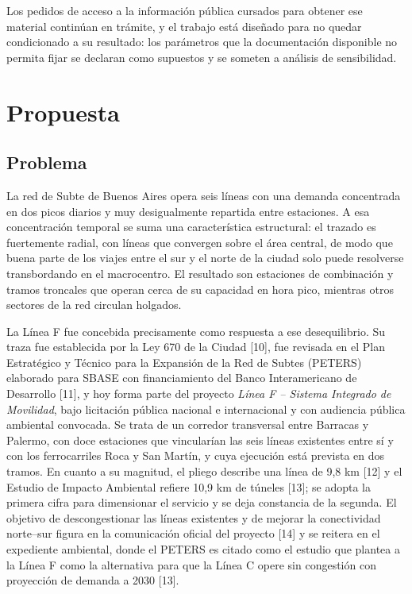\documentclass{article}
\begin{document}
Los pedidos de acceso a la información pública cursados para obtener ese material continúan en trámite, y el
trabajo está diseñado para no quedar condicionado a su resultado: los parámetros que la documentación
disponible no permita fijar se declaran como supuestos y se someten a análisis de sensibilidad.

\section{Propuesta}

\subsection{Problema}

La red de Subte de Buenos Aires opera seis líneas con una demanda concentrada en dos picos diarios y muy
desigualmente repartida entre estaciones. A esa concentración temporal se suma una característica
estructural: el trazado es fuertemente radial, con líneas que convergen sobre el área central, de modo que
buena parte de los viajes entre el sur y el norte de la ciudad solo puede resolverse transbordando en el
macrocentro. El resultado son estaciones de combinación y tramos troncales que operan cerca de su
capacidad en hora pico, mientras otros sectores de la red circulan holgados.

La Línea F fue concebida precisamente como respuesta a ese desequilibrio. Su traza fue establecida por la
Ley 670 de la Ciudad [10], fue revisada en el Plan Estratégico y Técnico para la Expansión de la Red de
Subtes (PETERS) elaborado para SBASE con financiamiento del Banco Interamericano de Desarrollo [11], y hoy
forma parte
del proyecto \textit{Línea F -- Sistema Integrado de Movilidad}, bajo licitación pública nacional
e internacional y con audiencia pública ambiental convocada. Se trata de un corredor
transversal entre Barracas y Palermo, con doce estaciones que vincularían las seis líneas existentes entre
sí y con los ferrocarriles Roca y San Martín, y cuya ejecución está prevista en dos tramos. En cuanto a su
magnitud, el pliego describe una línea de 9,8 km [12] y el Estudio
de Impacto Ambiental refiere 10,9 km de túneles [13]; se adopta la primera cifra para dimensionar el
servicio y se deja constancia de la segunda. El objetivo de descongestionar las líneas existentes y de mejorar la
conectividad norte--sur figura en la comunicación oficial del proyecto [14] y se reitera en el expediente
ambiental, donde el PETERS es citado como el estudio que plantea a la Línea F como la alternativa para que
la Línea C opere sin congestión con proyección de demanda a 2030 [13].
\end{document}
